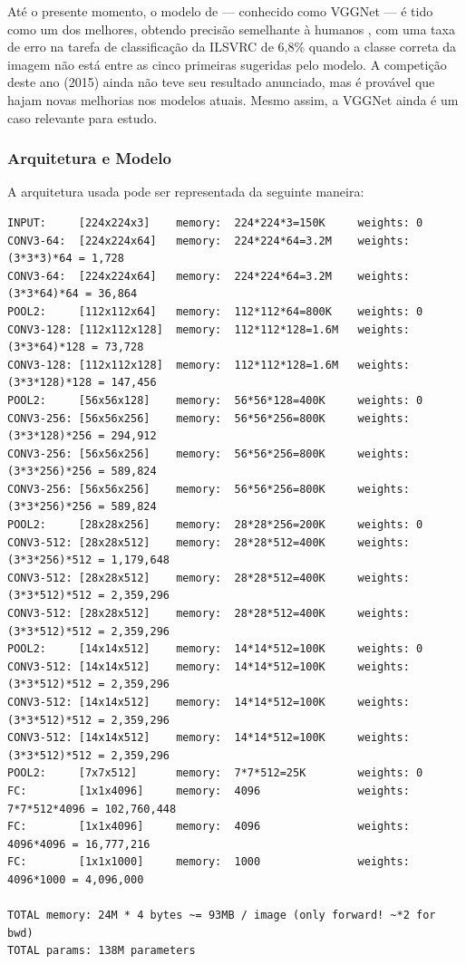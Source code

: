 Até o presente momento, o modelo de \citep{zeiler2014visualizing} --- conhecido
como VGGNet --- é tido como um dos melhores, obtendo precisão semelhante à
humanos \citep{human}, com uma taxa de erro na tarefa de classificação da ILSVRC
de 6,8\% quando a classe correta da imagem não está entre as cinco primeiras
sugeridas pelo modelo. A competição deste ano (2015) ainda não teve seu
resultado anunciado, mas é provável que hajam novas melhorias nos modelos
atuais. Mesmo assim, a VGGNet ainda é um caso relevante para estudo.

\subsubsection{Arquitetura e Modelo}

A arquitetura usada pode ser representada da seguinte maneira:~\cite{cs231n}

\begin{footnotesize}
\begin{verbatim}
INPUT:     [224x224x3]    memory:  224*224*3=150K     weights: 0
CONV3-64:  [224x224x64]   memory:  224*224*64=3.2M    weights: (3*3*3)*64 = 1,728
CONV3-64:  [224x224x64]   memory:  224*224*64=3.2M    weights: (3*3*64)*64 = 36,864
POOL2:     [112x112x64]   memory:  112*112*64=800K    weights: 0
CONV3-128: [112x112x128]  memory:  112*112*128=1.6M   weights: (3*3*64)*128 = 73,728
CONV3-128: [112x112x128]  memory:  112*112*128=1.6M   weights: (3*3*128)*128 = 147,456
POOL2:     [56x56x128]    memory:  56*56*128=400K     weights: 0
CONV3-256: [56x56x256]    memory:  56*56*256=800K     weights: (3*3*128)*256 = 294,912
CONV3-256: [56x56x256]    memory:  56*56*256=800K     weights: (3*3*256)*256 = 589,824
CONV3-256: [56x56x256]    memory:  56*56*256=800K     weights: (3*3*256)*256 = 589,824
POOL2:     [28x28x256]    memory:  28*28*256=200K     weights: 0
CONV3-512: [28x28x512]    memory:  28*28*512=400K     weights: (3*3*256)*512 = 1,179,648
CONV3-512: [28x28x512]    memory:  28*28*512=400K     weights: (3*3*512)*512 = 2,359,296
CONV3-512: [28x28x512]    memory:  28*28*512=400K     weights: (3*3*512)*512 = 2,359,296
POOL2:     [14x14x512]    memory:  14*14*512=100K     weights: 0
CONV3-512: [14x14x512]    memory:  14*14*512=100K     weights: (3*3*512)*512 = 2,359,296
CONV3-512: [14x14x512]    memory:  14*14*512=100K     weights: (3*3*512)*512 = 2,359,296
CONV3-512: [14x14x512]    memory:  14*14*512=100K     weights: (3*3*512)*512 = 2,359,296
POOL2:     [7x7x512]      memory:  7*7*512=25K        weights: 0
FC:        [1x1x4096]     memory:  4096               weights: 7*7*512*4096 = 102,760,448
FC:        [1x1x4096]     memory:  4096               weights: 4096*4096 = 16,777,216
FC:        [1x1x1000]     memory:  1000               weights: 4096*1000 = 4,096,000

TOTAL memory: 24M * 4 bytes ~= 93MB / image (only forward! ~*2 for bwd)
TOTAL params: 138M parameters

\end{verbatim}
\end{footnotesize}

